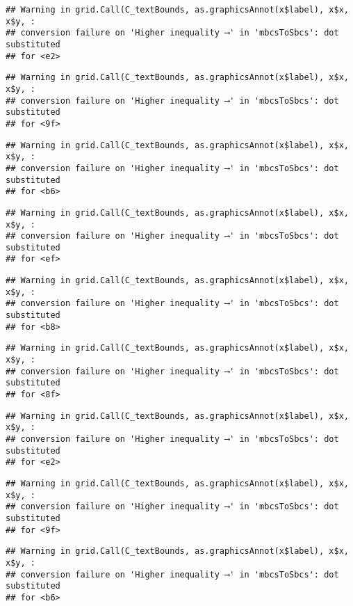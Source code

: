 \documentclass[
]{article}
\begin{document}
\begin{verbatim}
## Warning in grid.Call(C_textBounds, as.graphicsAnnot(x$label), x$x, x$y, :
## conversion failure on 'Higher inequality ⟶️' in 'mbcsToSbcs': dot substituted
## for <e2>
\end{verbatim}

\begin{verbatim}
## Warning in grid.Call(C_textBounds, as.graphicsAnnot(x$label), x$x, x$y, :
## conversion failure on 'Higher inequality ⟶️' in 'mbcsToSbcs': dot substituted
## for <9f>
\end{verbatim}

\begin{verbatim}
## Warning in grid.Call(C_textBounds, as.graphicsAnnot(x$label), x$x, x$y, :
## conversion failure on 'Higher inequality ⟶️' in 'mbcsToSbcs': dot substituted
## for <b6>
\end{verbatim}

\begin{verbatim}
## Warning in grid.Call(C_textBounds, as.graphicsAnnot(x$label), x$x, x$y, :
## conversion failure on 'Higher inequality ⟶️' in 'mbcsToSbcs': dot substituted
## for <ef>
\end{verbatim}

\begin{verbatim}
## Warning in grid.Call(C_textBounds, as.graphicsAnnot(x$label), x$x, x$y, :
## conversion failure on 'Higher inequality ⟶️' in 'mbcsToSbcs': dot substituted
## for <b8>
\end{verbatim}

\begin{verbatim}
## Warning in grid.Call(C_textBounds, as.graphicsAnnot(x$label), x$x, x$y, :
## conversion failure on 'Higher inequality ⟶️' in 'mbcsToSbcs': dot substituted
## for <8f>
\end{verbatim}

\begin{verbatim}
## Warning in grid.Call(C_textBounds, as.graphicsAnnot(x$label), x$x, x$y, :
## conversion failure on 'Higher inequality ⟶️' in 'mbcsToSbcs': dot substituted
## for <e2>
\end{verbatim}

\begin{verbatim}
## Warning in grid.Call(C_textBounds, as.graphicsAnnot(x$label), x$x, x$y, :
## conversion failure on 'Higher inequality ⟶️' in 'mbcsToSbcs': dot substituted
## for <9f>
\end{verbatim}

\begin{verbatim}
## Warning in grid.Call(C_textBounds, as.graphicsAnnot(x$label), x$x, x$y, :
## conversion failure on 'Higher inequality ⟶️' in 'mbcsToSbcs': dot substituted
## for <b6>
\end{verbatim}
\end{document}
